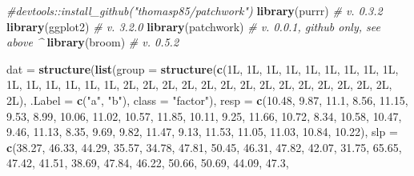 \documentclass[]{article}
\newenvironment{Shaded}{\begin{snugshade}}{\end{snugshade}}
\newcommand{\KeywordTok}[1]{\textcolor[rgb]{0.13,0.29,0.53}{\textbf{#1}}}
\newcommand{\DataTypeTok}[1]{\textcolor[rgb]{0.13,0.29,0.53}{#1}}
\newcommand{\FloatTok}[1]{\textcolor[rgb]{0.00,0.00,0.81}{#1}}
\newcommand{\StringTok}[1]{\textcolor[rgb]{0.31,0.60,0.02}{#1}}
\newcommand{\CommentTok}[1]{\textcolor[rgb]{0.56,0.35,0.01}{\textit{#1}}}
\newcommand{\NormalTok}[1]{#1}
\begin{document}
\begin{Shaded}
\begin{Highlighting}[]
\CommentTok{#devtools::install_github("thomasp85/patchwork")}
\KeywordTok{library}\NormalTok{(purrr) }\CommentTok{# v. 0.3.2}
\KeywordTok{library}\NormalTok{(ggplot2) }\CommentTok{# v. 3.2.0}
\KeywordTok{library}\NormalTok{(patchwork) }\CommentTok{# v. 0.0.1, github only, see above ^}
\KeywordTok{library}\NormalTok{(broom) }\CommentTok{# v. 0.5.2}

\NormalTok{dat =}\StringTok{ }\KeywordTok{structure}\NormalTok{(}\KeywordTok{list}\NormalTok{(}\DataTypeTok{group =} \KeywordTok{structure}\NormalTok{(}\KeywordTok{c}\NormalTok{(1L, 1L, 1L, 1L, 1L, 1L, 1L, }
\NormalTok{1L, 1L, 1L, 1L, 1L, 1L, 1L, 1L, 2L, 2L, 2L, 2L, 2L, 2L, 2L, 2L, }
\NormalTok{2L, 2L, 2L, 2L, 2L, 2L, 2L), }\DataTypeTok{.Label =} \KeywordTok{c}\NormalTok{(}\StringTok{"a"}\NormalTok{, }\StringTok{"b"}\NormalTok{), }\DataTypeTok{class =} \StringTok{"factor"}\NormalTok{), }
    \DataTypeTok{resp =} \KeywordTok{c}\NormalTok{(}\FloatTok{10.48}\NormalTok{, }\FloatTok{9.87}\NormalTok{, }\FloatTok{11.1}\NormalTok{, }\FloatTok{8.56}\NormalTok{, }\FloatTok{11.15}\NormalTok{, }\FloatTok{9.53}\NormalTok{, }\FloatTok{8.99}\NormalTok{, }\FloatTok{10.06}\NormalTok{, }
    \FloatTok{11.02}\NormalTok{, }\FloatTok{10.57}\NormalTok{, }\FloatTok{11.85}\NormalTok{, }\FloatTok{10.11}\NormalTok{, }\FloatTok{9.25}\NormalTok{, }\FloatTok{11.66}\NormalTok{, }\FloatTok{10.72}\NormalTok{, }\FloatTok{8.34}\NormalTok{, }\FloatTok{10.58}\NormalTok{, }
    \FloatTok{10.47}\NormalTok{, }\FloatTok{9.46}\NormalTok{, }\FloatTok{11.13}\NormalTok{, }\FloatTok{8.35}\NormalTok{, }\FloatTok{9.69}\NormalTok{, }\FloatTok{9.82}\NormalTok{, }\FloatTok{11.47}\NormalTok{, }\FloatTok{9.13}\NormalTok{, }\FloatTok{11.53}\NormalTok{, }
    \FloatTok{11.05}\NormalTok{, }\FloatTok{11.03}\NormalTok{, }\FloatTok{10.84}\NormalTok{, }\FloatTok{10.22}\NormalTok{), }\DataTypeTok{slp =} \KeywordTok{c}\NormalTok{(}\FloatTok{38.27}\NormalTok{, }\FloatTok{46.33}\NormalTok{, }\FloatTok{44.29}\NormalTok{, }
    \FloatTok{35.57}\NormalTok{, }\FloatTok{34.78}\NormalTok{, }\FloatTok{47.81}\NormalTok{, }\FloatTok{50.45}\NormalTok{, }\FloatTok{46.31}\NormalTok{, }\FloatTok{47.82}\NormalTok{, }\FloatTok{42.07}\NormalTok{, }\FloatTok{31.75}\NormalTok{, }\FloatTok{65.65}\NormalTok{, }
    \FloatTok{47.42}\NormalTok{, }\FloatTok{41.51}\NormalTok{, }\FloatTok{38.69}\NormalTok{, }\FloatTok{47.84}\NormalTok{, }\FloatTok{46.22}\NormalTok{, }\FloatTok{50.66}\NormalTok{, }\FloatTok{50.69}\NormalTok{, }\FloatTok{44.09}\NormalTok{, }\FloatTok{47.3}\NormalTok{, }

\end{Highlighting}
\end{Shaded}
\end{document}
